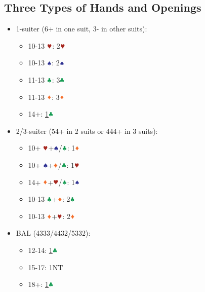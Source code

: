 \documentclass{article}
\begin{document}
\begin{multicols}{2}
\section{Three Types of Hands and Openings}
\begin{itemize}
    \item 1-suiter (6+ in one suit, 3- in other suits):
    \begin{itemize}
        \item 10-13 $\hhh$: 2$\hhh$
        \item 10-13 $\sss$: 2$\sss$
        \item 11-13 $\ccc$: 3$\ccc$
        \item 11-13 $\ddd$: 3$\ddd$
        \item 14+: \hyperref[sec:1c]{1$\ccc$}
    \end{itemize}
    \item 2/3-suiter (54+ in 2 suits or 444+ in 3 suits):
    \begin{itemize}
        \item 10+ $\hhh$+$\sss$/$\ccc$: 1$\ddd$
        \item 10+ $\sss$+$\ddd$/$\ccc$: 1$\hhh$
        \item 14+ $\ddd$+$\hhh$/$\ccc$: 1$\sss$
        \item 10-13 $\ccc$+$\ddd$: 2$\ccc$
        \item 10-13 $\ddd$+$\hhh$: 2$\ddd$
    \end{itemize}
    \item BAL (4333/4432/5332):
    \begin{itemize}
        \item 12-14: \hyperref[sec:1c]{1$\ccc$}
        \item 15-17: 1NT
        \item 18+: \hyperref[sec:1c]{1$\ccc$}
    \end{itemize}
\end{itemize}


\end{multicols}
\end{document}
